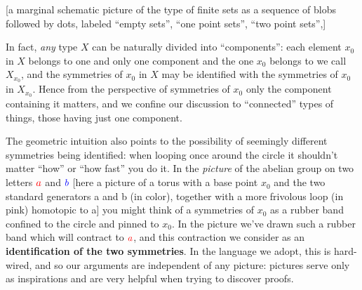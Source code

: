 [a marginal schematic picture of the type of finite sets as a sequence of blobs followed by dots, labeled ``empty sets'', ``one point sets'', ``two point sets'',]

In fact, \emph{any} type $X$ can be naturally divided into ``components'': each element $x_0$ in $X$ belongs to one and only one component and the one $x_0$ belongs to we call $X_{x_0}$, and the symmetries of $x_0$ in $X$ may be identified with the symmetries of $x_0$ in $X_{x_0}$. Hence from the perspective of symmetries of $x_0$ only the component containing it matters, and we confine our discussion to ``connected'' types of things, \ie those having just one component.

The geometric intuition also points to the possibility of seemingly different symmetries being identified: when looping once around the circle it shouldn't matter ``how'' or ``how fast'' you do it. In the \emph{picture} of the abelian group on two letters ${\color{red}a}$ and ${\color{blue}b}$
[here a picture of a torus with a base point $x_0$ and the two standard generators a and b (in color), together with a more frivolous loop (in pink) homotopic to a]
you might think of a symmetries of $x_0$ as a {\color{pink}rubber band} confined to the circle and pinned to $x_0$. In the picture we've drawn such a {\color{pink}rubber band} which will contract to ${\color{red}a}$, and this contraction we consider as an \textbf{identification of the two symmetries}.
In the language we adopt, this is hard-wired, and so our arguments are independent of any picture: pictures serve only as inspirations and are very helpful when trying to discover proofs.


